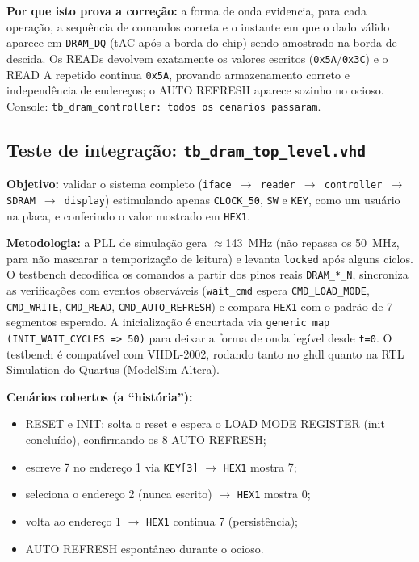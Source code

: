 \documentclass[12pt,a4paper]{article}
\begin{document}
\textbf{Por que isto prova a correção:} a forma de onda evidencia, para cada
operação, a sequência de comandos correta e o instante em que o dado válido aparece
em \texttt{DRAM\_DQ} (tAC após a borda do chip) sendo amostrado na borda de descida.
Os READs devolvem exatamente os valores escritos (\texttt{0x5A}/\texttt{0x3C}) e o
READ A repetido continua \texttt{0x5A}, provando armazenamento correto e
independência de endereços; o AUTO REFRESH aparece sozinho no ocioso. Console:
\texttt{tb\_dram\_controller: todos os cenarios passaram}.

\subsection{Teste de integração: \texttt{tb\_dram\_top\_level.vhd}}
\textbf{Objetivo:} validar o sistema completo (\texttt{iface
$\rightarrow$ reader $\rightarrow$ controller $\rightarrow$ SDRAM $\rightarrow$
display}) estimulando apenas \texttt{CLOCK\_50}, \texttt{SW} e \texttt{KEY}, como um
usuário na placa, e conferindo o valor mostrado em \texttt{HEX1}.

\textbf{Metodologia:} a PLL de simulação gera $\approx$143~MHz (não repassa os
50~MHz, para não mascarar a temporização de leitura) e levanta \texttt{locked} após
alguns ciclos. O testbench decodifica os comandos a partir dos pinos reais
\texttt{DRAM\_*\_N}, sincroniza as verificações com eventos observáveis
(\texttt{wait\_cmd} espera \texttt{CMD\_LOAD\_MODE}, \texttt{CMD\_WRITE},
\texttt{CMD\_READ}, \texttt{CMD\_AUTO\_REFRESH}) e compara \texttt{HEX1} com o padrão
de 7 segmentos esperado. A inicialização é encurtada via
\texttt{generic map (INIT\_WAIT\_CYCLES => 50)} para deixar a forma de onda legível
desde \texttt{t=0}. O testbench é compatível com VHDL-2002, rodando tanto no ghdl
quanto na RTL Simulation do Quartus (ModelSim-Altera).

\textbf{Cenários cobertos (a ``história''):}
\begin{itemize}
  \item RESET e INIT: solta o reset e espera o LOAD MODE REGISTER (init concluído),
        confirmando os 8 AUTO REFRESH;
  \item escreve 7 no endereço 1 via \texttt{KEY[3]} $\rightarrow$ \texttt{HEX1}
        mostra 7;
  \item seleciona o endereço 2 (nunca escrito) $\rightarrow$ \texttt{HEX1} mostra 0;
  \item volta ao endereço 1 $\rightarrow$ \texttt{HEX1} continua 7 (persistência);
  \item AUTO REFRESH espontâneo durante o ocioso.
\end{itemize}
\end{document}
